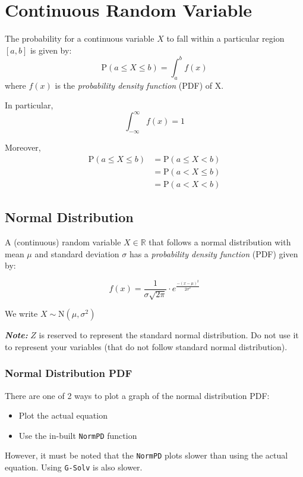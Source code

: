 \documentclass[a5paper]{memoir}
\def\code#1{\texttt{#1}}
\def\note#1{\textcolor[HTML]{109fa9}{\textbf{\textit{Note:}}} #1}
\begin{document}
\section{Continuous Random Variable}
The probability for a continuous variable $X$ to fall within a particular region $[a,b]$ is given by:
\begin{equation}
	\mathrm{P}(a \leq X \leq b) = \int_{a}^{b} f(x)
\end{equation}
where $f(x)$ is the \textit{probability density function} (PDF) of X.

In particular,
\[
\int_{-\infty}^{\infty}f(x) = 1
\]

Moreover, 
\begin{align*}
	\mathrm{P}(a \leq X \leq b) &= \mathrm{P}(a \leq X < b)\\
	&= \mathrm{P}(a < X \leq b) \\
	&= \mathrm{P}(a < X < b)
\end{align*}

\subsection{Normal Distribution}
A (continuous) random variable $X\in \mathbb{R}$ that follows a normal distribution with mean $\mu$ and standard deviation $\sigma$ has a \textit{probability density function} (PDF) given by:

\begin{equation}
	f(x)=\frac{1}{\sigma\sqrt{2\pi}} \cdot e^{\frac{-(x-\mu)^2}{2\sigma^2}}
\end{equation}

We write $X \sim \mathrm{N} (\mu,\sigma^2)$

\note{$Z$ is reserved to represent the standard normal distribution. Do not use it to represent your variables (that do not follow standard normal distribution).}

\subsubsection{Normal Distribution PDF}
There are one of 2 ways to plot a graph of the normal distribution PDF:

\begin{itemize}
	\item Plot the actual equation
	\item Use the in-built \code{NormPD} function
\end{itemize}

However, it must be noted that the \code{NormPD} plots slower than using the actual equation. Using \code{G-Solv} is also slower.
\end{document}

